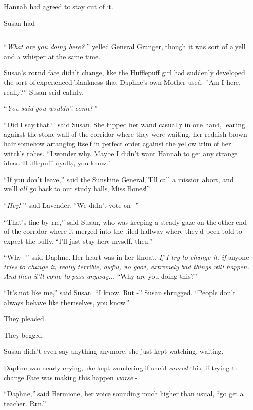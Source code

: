 Hannah had agreed to stay out of it.

Susan had -

\begin{center}\rule{3in}{0.4pt}\end{center}

``\emph{What are you doing here?} '' yelled General Granger, though it was
sort of a yell and a whisper at the same time.

Susan's round face didn't change, like the Hufflepuff girl had suddenly
developed the sort of experienced blankness that Daphne's own Mother
used. ``Am I here, really?'' Susan said calmly.

``\emph{You said you wouldn't come!} ''

``Did I say that?'' said Susan. She flipped her wand casually in one
hand, leaning against the stone wall of the corridor where they were
waiting, her reddish-brown hair somehow arranging itself in perfect
order against the yellow trim of her witch's robes. ``I wonder why.
Maybe I didn't want Hannah to get any strange ideas. Hufflepuff loyalty,
you know.''

``If you don't leave,'' said the Sunshine General,''I'll call a mission
abort, and we'll \emph{all} go back to our study halls, Miss Bones!''

``\emph{Hey!} '' said Lavender. ``We didn't vote on -''

``That's fine by me,'' said Susan, who was keeping a steady gaze on the
other end of the corridor where it merged into the tiled hallway where
they'd been told to expect the bully. ``I'll just stay here myself,
then.''

``Why -'' said Daphne. Her heart was in her throat. \emph{If I try to
change it, if} anyone \emph{tries to change it, really terrible, awful,
no good, extremely bad things will happen. And then it'll come to pass
anyway...} ``Why are you doing this?''

``It's not like me,'' said Susan. ``I know. But -'' Susan shrugged.
``People don't always behave like themselves, you know.''

They pleaded.

They begged.

Susan didn't even say anything anymore, she just kept watching, waiting.

Daphne was nearly crying, she kept wondering if she'd \emph{caused}
this, if trying to change Fate was making this happen \emph{worse} -

``Daphne,'' said Hermione, her voice sounding much higher than usual,
``go get a teacher. Run.''

